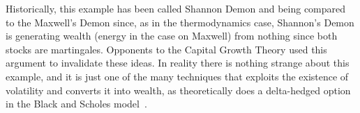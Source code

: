 Historically, this example has been called Shannon Demon \cite{poundstone2010fortune} and being compared to the Maxwell's Demon since, as in the thermodynamics case, Shannon's Demon is generating wealth (energy in the case on Maxwell) from nothing since both stocks are martingales. 
Opponents to the Capital Growth Theory used this argument to invalidate these ideas. In reality there is nothing strange about this example, and it is just one of the many techniques that exploits the existence of volatility and converts it into wealth, as theoretically does a delta-hedged option in the Black and Scholes model~\cite{black1973pricing}.
